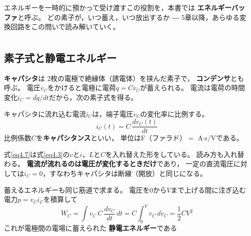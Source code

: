 エネルギーを一時的に預かって受け渡すこの役割を，本書では
\textbf{エネルギーバッファ}と呼ぶ。
どの素子が，いつ蓄え，いつ放出するか ―
5章以降，あらゆる変換回路をこの問いで読み解いていく。

\section{}
\label{sec4.3}

\subsection{素子式と静電エネルギー}

\textbf{キャパシタ}は
2枚の電極で絶縁体（誘電体）を挟んだ素子で，
\textbf{コンデンサ}とも呼ぶ。
電圧$v_C$をかけると電極に電荷$q = Cv_C$が蓄えられる。
電流は電荷の時間変化$i_C = dq/dt$だから，次の素子式を得る。

\begin{定義}[キャパシタ]
\label{def4.2}
キャパシタに流れ込む電流$i_C$は，端子電圧$v_C$の変化率に比例する。
\begin{equation}
i_C(t) = C\,\frac{dv_C(t)}{dt}
\label{eq4.7}
\end{equation}
比例係数$C$を\textbf{キャパシタンス}といい，
単位はF（ファラド）$=$ A$\cdot$s/Vである。
\end{定義}

式\ref{eq4.7}は式\ref{eq4.3}の$v$と$i$，$L$と$C$を入れ替えた形をしている。
読み方も入れ替わる。
\textbf{電流が流れるのは電圧が変化するときだけ}であり，
一定の直流電圧に対しては$i_C = 0$，すなわちキャパシタは断線（開放）と同じになる。

蓄えるエネルギーも同じ筋道で求まる。
電圧を$0$から$V$まで上げる間に注ぎ込む電力$p = v_C i_C$を積算して
\begin{equation}
W_C = \int v_C\,C\,\frac{dv_C}{dt}\,dt = C\int_0^{V} v_C\,dv_C = \frac{1}{2}CV^2
\label{eq4.8}
\end{equation}
これが電極間の電場に蓄えられた
\textbf{静電エネルギー}である

\subsection{}

